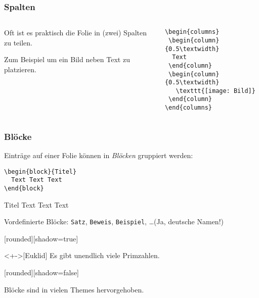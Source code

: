 \begin{slide}
  \frametitle{Spalten}
  \begin{columns}
    \begin{column}{0.4\textwidth}
      Oft ist es praktisch die Folie in (zwei) Spalten zu teilen.

      Zum Beispiel um ein Bild neben Text zu platzieren.
    \end{column}
    \begin{column}{0.6\textwidth}
\begin{lstlisting}
\begin{columns}
 \begin{column}{0.5\textwidth}
  Text
 \end{column}
 \begin{column}{0.5\textwidth}
   \texttt{[image: Bild]}
 \end{column}
\end{columns}
\end{lstlisting}
    \end{column}
  \end{columns}
\end{slide}

\begin{slide}
  \frametitle{Blöcke}

  \onslide<+->

  Einträge auf einer Folie können in \emph{Blöcken} gruppiert werden:

\begin{lstlisting}
\begin{block}{Titel}
  Text Text Text
\end{block}
\end{lstlisting}

  \onslide<+->

  \begin{block}{Titel}
    Text Text Text
  \end{block}

  \onslide<+->

  Vordefinierte Blöcke: \texttt{Satz}, \texttt{Beweis}, \texttt{Beispiel}, \dots (Ja, deutsche Namen!)


  [rounded][shadow=true]
  \begin{Satz}<+->[Euklid]
    Es gibt unendlich viele Primzahlen.
  \end{Satz}
  [rounded][shadow=false]

  \onslide<+->
  Blöcke sind in vielen Themes hervorgehoben.
\end{slide}

